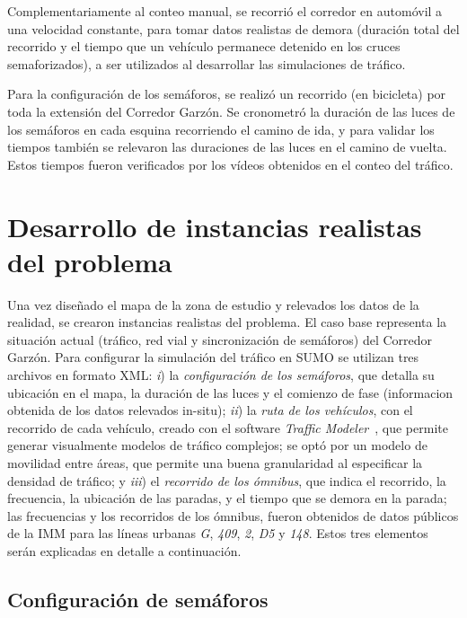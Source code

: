 Complementariamente al conteo manual, se recorrió el corredor en automóvil a una velocidad constante, para tomar datos realistas de demora (duración total del recorrido y el tiempo que un vehículo permanece detenido en los cruces semaforizados),
 a ser utilizados al desarrollar las simulaciones de tráfico. 

Para la configuración de los semáforos, se realizó un recorrido (en bicicleta) por toda la extensión del Corredor Garzón. Se cronometró la duración de las luces de los semáforos en cada esquina recorriendo el camino de ida, y para validar los tiempos también se relevaron las duraciones de las luces en el camino de vuelta. Estos tiempos fueron verificados por los vídeos obtenidos en el conteo del tráfico.


\section{Desarrollo de instancias realistas del problema}

Una vez diseñado el mapa de la zona de estudio y relevados los datos de la realidad, se crearon instancias realistas del problema. El caso base representa la situación actual (tráfico, red vial y sincronización de semáforos) del Corredor Garzón. Para configurar la simulación del tráfico en SUMO se utilizan tres archivos en formato XML: \textit{i}) la \emph{configuración de los semáforos}, que detalla su ubicación en el mapa, la duración de las luces y el comienzo de fase (informacion obtenida de los datos relevados in-situ); \textit{ii}) la \emph{ruta de los vehículos}, con el recorrido de cada vehículo, creado con el software \emph{Traffic Modeler}~\citep{TrafficModeler}, que permite generar visualmente modelos de tráfico complejos; se optó por un modelo de movilidad entre áreas, que permite una buena granularidad al especificar la densidad de tráfico; y \textit{iii}) el \emph{recorrido de los ómnibus}, que indica el recorrido, la frecuencia, la ubicación de las paradas, y el tiempo que se demora en la parada; las frecuencias y los recorridos de los ómnibus, fueron obtenidos de datos públicos de la IMM para las líneas urbanas \textit{G}, \textit{409}, \textit{2}, \textit{D5} y \textit{148}. Estos tres elementos serán explicadas en detalle a continuación.

\subsection{Configuración de semáforos}

